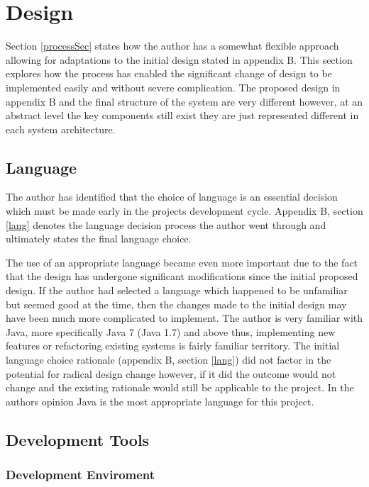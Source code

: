 \chapter{Design}
\label{DesignSec}
Section \ref{processSec} states how the author has a somewhat flexible approach allowing for adaptations to the initial design stated in appendix B. This section explores how the process has enabled the significant change of design to be implemented easily and without severe complication. The proposed design in appendix B and the final structure of the system are very different however, at an abstract level the key components still exist they are just represented different in each system architecture. 

\section{Language}

The author has identified that the choice of language is an essential decision which must be made early in the projects development cycle. Appendix B, section \ref{lang} denotes the language decision process the author went through and ultimately states the final language choice.

The use of an appropriate language became even more important due to the fact that the design has undergone significant modifications since the initial proposed design. If the author had selected a language which happened to be unfamiliar but seemed good at the time, then the changes made to the initial design may have been much more complicated to implement. The author is very familiar with Java, more specifically Java 7 (Java 1.7) and above thus, implementing new features or refactoring existing systems is fairly familiar territory. The initial language choice rationale (appendix B, section \ref{lang}) did not factor in the potential for radical design change however, if it did the outcome would not change and the existing rationale would still be applicable to the project. In the authors opinion Java is the most appropriate language for this project.

\section{Development Tools}
\subsection{Development Enviroment}

